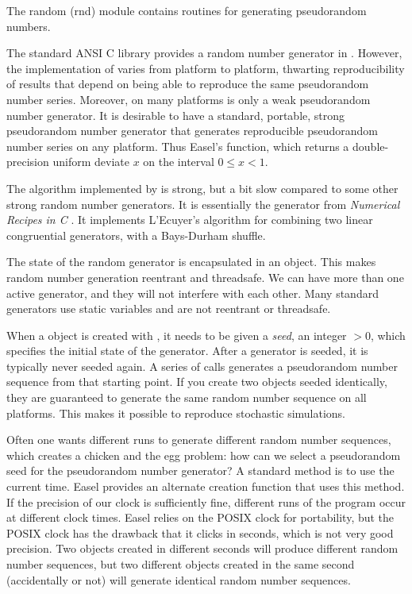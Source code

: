 The random (rnd) module contains routines for generating pseudorandom
numbers.

The standard ANSI C library provides a random number generator in
. However, the implementation of  varies
from platform to platform, thwarting reproducibility of results that
depend on being able to reproduce the same pseudorandom number series.
Moreover, on many platforms  is only a weak pseudorandom
number generator.  It is desirable to have a standard, portable,
strong pseudorandom number generator that generates reproducible
pseudorandom number series on any platform.  Thus Easel's
 function, which returns a double-precision
uniform deviate $x$ on the interval $0 \leq x < 1$.

The algorithm implemented by  is strong, but a
bit slow compared to some other strong random number generators. It is
essentially the  generator from \emph{Numerical Recipes
in C} \cite{Press92}. It implements L'Ecuyer's algorithm for combining
two linear congruential generators, with a Bays-Durham shuffle.

The state of the random generator is encapsulated in an
 object. This makes random number generation
reentrant and threadsafe. We can have more than one active generator,
and they will not interfere with each other. Many standard generators
use static variables and are not reentrant or threadsafe.

When a  object is created with
, it needs to be given a \emph{seed},
an integer $> 0$, which specifies the initial state of the
generator. After a generator is seeded, it is typically never seeded
again. A series of  calls generates a
pseudorandom number sequence from that starting point. If you create
two  objects seeded identically, they are
guaranteed to generate the same random number sequence on all
platforms. This makes it possible to reproduce stochastic simulations.

Often one wants different runs to generate different random number
sequences, which creates a chicken and the egg problem: how can we
select a pseudorandom seed for the pseudorandom number generator? A
standard method is to use the current time. Easel provides an
alternate creation function
 that uses this method. If
the precision of our clock is sufficiently fine, different runs of the
program occur at different clock times. Easel relies on the POSIX
clock for portability, but the POSIX clock has the drawback that it
clicks in seconds, which is not very good precision. Two
 objects created in different seconds will
produce different random number sequences, but two different
 objects created in the same second
(accidentally or not) will generate identical random number sequences.

